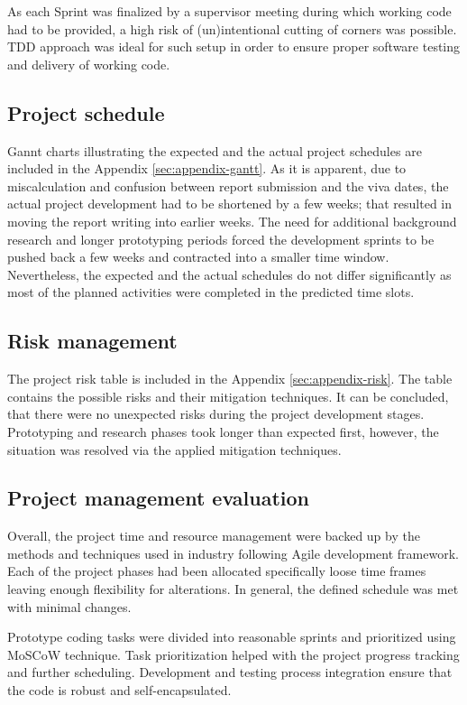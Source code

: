 		As each Sprint was finalized by a supervisor meeting during which working code had to be provided, a high risk of (un)intentional cutting of corners was possible. TDD approach was ideal for such setup in order to ensure proper software testing and delivery of working code.
		
	\subsection{Project schedule}
		Gannt charts illustrating the expected and the actual project schedules are included in the Appendix \ref{sec:appendix-gantt}. As it is apparent, due to miscalculation and confusion between report submission and the viva dates, the actual project development had to be shortened by a few weeks; that resulted in moving the report writing into earlier weeks. The need for additional background research and longer prototyping periods forced the development sprints to be pushed back a few weeks and contracted into a smaller time window. Nevertheless, the expected and the actual schedules do not differ significantly as most of the planned activities were completed in the predicted time slots.
		
	\subsection{Risk management}
		The project risk table is included in the Appendix \ref{sec:appendix-risk}. The table contains the possible risks and their mitigation techniques. It can be concluded, that there were no unexpected risks during the project development stages. Prototyping and research phases took longer than expected first, however, the situation was resolved via the applied mitigation techniques.
		
	\subsection{Project management evaluation}
		Overall, the project time and resource management were backed up by the methods and techniques used in industry following Agile development framework. Each of the project phases had been allocated specifically loose time frames leaving enough flexibility for alterations. In general, the defined schedule was met with minimal changes. 
		
		Prototype coding tasks were divided into reasonable sprints and prioritized using MoSCoW technique. Task prioritization helped with the project progress tracking and further scheduling. Development and testing process integration ensure that the code is robust and self-encapsulated.
		
